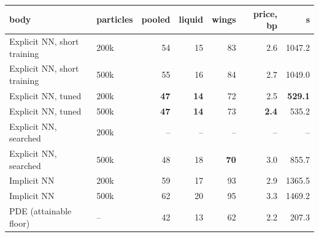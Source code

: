 \begin{tabular}{l l rrr r r}
\toprule
body & particles & pooled & liquid & wings & price, bp & s\\
\midrule
Explicit NN, short training & 200k & 54 & 15 & 83 & 2.6 & 1047.2\\
Explicit NN, short training & 500k & 55 & 16 & 84 & 2.7 & 1049.0\\
Explicit NN, tuned & 200k & \textbf{47} & \textbf{14} & 72 & 2.5 & \textbf{529.1}\\
Explicit NN, tuned & 500k & \textbf{47} & \textbf{14} & 73 & \textbf{2.4} & 535.2\\
Explicit NN, searched & 200k & -- & -- & -- & -- & --\\
Explicit NN, searched & 500k & 48 & 18 & \textbf{70} & 3.0 & 855.7\\
Implicit NN & 200k & 59 & 17 & 93 & 2.9 & 1365.5\\
Implicit NN & 500k & 62 & 20 & 95 & 3.3 & 1469.2\\
PDE (attainable floor) & -- & 42 & 13 & 62 & 2.2 & 207.3\\
\bottomrule
\end{tabular}

